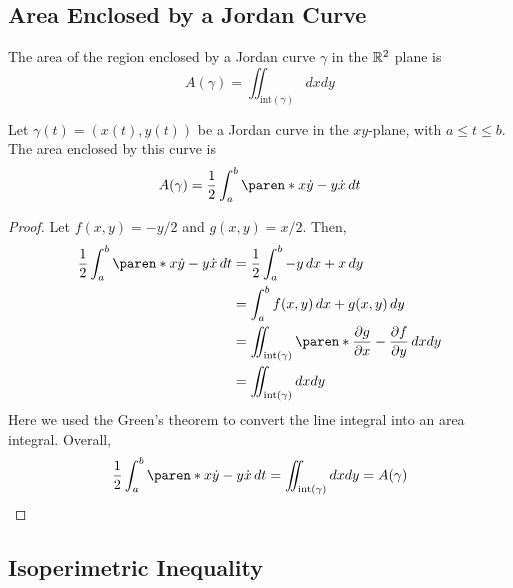 \documentclass[11pt]{penrose}
\renewcommand{\interior}[1]{\mathrm{int}(#1)}
\begin{document}
\subsection{Area Enclosed by a Jordan Curve}
The area of the region enclosed by a Jordan curve $\gamma$ in the $\mathbb{R}^2$ plane is
\begin{equation}
    A(\gamma) = \iint_{\interior{\gamma}} dxdy
\end{equation}

\begin{nthm}
    Let $\gamma(t) = (x(t), y(t))$ be a Jordan curve in the $xy$-plane, with $a \leq t \leq b$. The area enclosed by this curve is
    \begin{equation}
        A(\gamma) = \frac{1}{2} \int_a^b \paren*{x\dot{y} - y\dot{x}} \,dt
    \end{equation}
\end{nthm}
\begin{proof}
    Let $f(x,y) = -y/2$ and $g(x,y) = x/2$. Then,
    \begin{align}
        \frac{1}{2} \int_a^b \paren*{x\dot{y} - y\dot{x}} \,dt
        &= \frac{1}{2} \int_a^b  -y \,dx + x \,dy\\
        &= \int_a^b  f(x,y) \,dx + g(x,y) \,dy\\
        &= \iint_{\interior{\gamma}} \paren*{ \frac{\pd g}{\pd x} - \frac{\pd f}{\pd y} } \,dxdy\\
        &= \iint_{\interior{\gamma}} dxdy
    \end{align}
    Here we used the Green's theorem to convert the line integral into an area integral. Overall,
    \begin{equation}
        \frac{1}{2} \int_a^b \paren*{x\dot{y} - y\dot{x}} \,dt = \iint_{\interior{\gamma}} dxdy = A(\gamma)
        \qedhere 
    \end{equation}
\end{proof}

\subsection{Isoperimetric Inequality}
\end{document}
